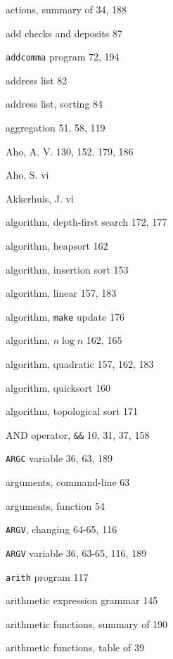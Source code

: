 \begin{multicols}{2}
actions, summary of 34, 188 

add checks and deposits 87 

\verb'addcomma' program 72, 194

address list 82 

address list, sorting 84

aggregation 51, 58, 119

Aho, A. V. 130, 152, 179, 186

Aho, S. vi 

Akkerhuis, J. vi 

algorithm, depth-first search 172, 177

algorithm, heapsort 162

algorithm, insertion sort 153

algorithm, linear 157, 183

algorithm, \verb'make' update 176

algorithm, $n\log n$ 162, 165

algorithm, quadratic 157, 162, 183

algorithm, quicksort 160

algorithm, topological sort 171

AND operator, \verb'&&' 10, 31, 37, 158

\verb'ARGC' variable 36, 63, 189

arguments, command-line 63

arguments, function 54

\verb'ARGV', changing 64-65, 116

\verb'ARGV' variable 36, 63-65, 116, 189

\verb'arith' program 117

arithmetic expression grammar 145

arithmetic functions, summary of 190

arithmetic functions, table of 39
\end{multicols}
